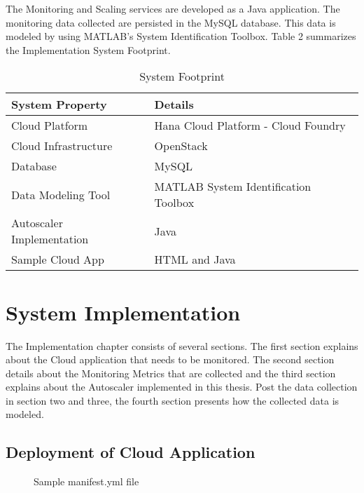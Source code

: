 \documentclass[article,type=msc,colorback,12pt,accentcolor=tud7b,table]{tudthesis}
\begin{document}
	The Monitoring and Scaling services are developed as a Java application. The monitoring data collected are persisted in the MySQL database. This data is modeled by using MATLAB's System Identification Toolbox. Table 2 summarizes the Implementation System Footprint.

\begin{table}[]
	\centering
	\caption{System Footprint}
	\label{my-label}
	\begin{tabular}{|l|l|}
		\hline
		\rowcolor[HTML]{FFCB2F} 
		\textbf{System Property}  & \textbf{Details}                     \\ \hline
		Cloud Platform            & Hana Cloud Platform - Cloud Foundry  \\ \hline
		Cloud Infrastructure      & OpenStack                            \\ \hline
		Database                  & MySQL                                \\ \hline
		Data Modeling Tool        & MATLAB System Identification Toolbox \\ \hline
		Autoscaler Implementation & Java                                 \\ \hline
		Sample Cloud App          & HTML and Java                        \\ \hline
	\end{tabular}
\end{table}

 \cleardoublepage
 \section{System Implementation}
The Implementation chapter consists of several sections. The first section explains about the Cloud application that needs to be monitored. The second section details about the Monitoring Metrics that are collected and the third section explains about the Autoscaler implemented in this thesis. Post the data collection in section two and three, the fourth section presents how the collected data is modeled. 
 
	\subsection{Deployment of Cloud Application} 

 \begin{figure}[!h]
 	\begin{center}
 		\makebox[\textwidth]{\texttt{[image: D2]}}
 	\end{center}
 	\caption{Sample manifest.yml file}
 \end{figure}
	
\end{document}
